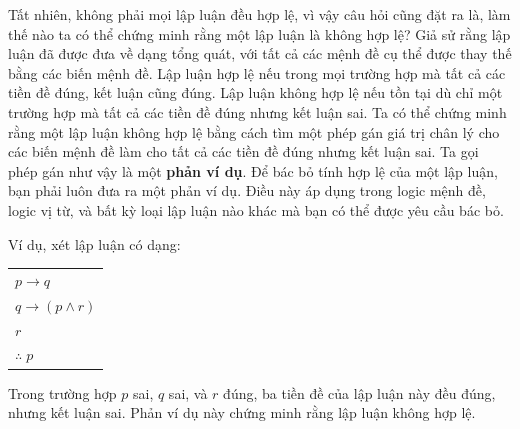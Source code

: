 Tất nhiên, không phải mọi lập luận đều hợp lệ, vì vậy câu hỏi cũng đặt ra là, làm thế nào ta có thể chứng minh rằng một lập luận là không hợp lệ? Giả sử rằng lập luận đã được đưa về dạng tổng quát, với tất cả các mệnh đề cụ thể được thay thế bằng các biến mệnh đề. Lập luận hợp lệ nếu trong mọi trường hợp mà tất cả các tiền đề đúng, kết luận cũng đúng. Lập luận không hợp lệ nếu tồn tại dù chỉ một trường hợp mà tất cả các tiền đề đúng nhưng kết luận sai. Ta có thể chứng minh rằng một lập luận không hợp lệ bằng cách tìm một phép gán giá trị chân lý cho các biến mệnh đề làm cho tất cả các tiền đề đúng nhưng kết luận sai. Ta gọi phép gán như vậy là một \textbf{phản ví dụ}. Để bác bỏ tính hợp lệ của một lập luận, bạn phải luôn đưa ra một phản ví dụ. Điều này áp dụng trong logic mệnh đề, logic vị từ, và bất kỳ loại lập luận nào khác mà bạn có thể được yêu cầu bác bỏ.

Ví dụ, xét lập luận có dạng:
\begin{center}
\begin{tabular}{l}
$p \to q$ \\
$q \to (p \land r)$ \\
$r$ \\
\hline
$\therefore\; p$
\end{tabular}
\end{center}
Trong trường hợp $p$ sai, $q$ sai, và $r$ đúng, ba tiền đề của lập luận này đều đúng, nhưng kết luận sai. Phản ví dụ này chứng minh rằng lập luận không hợp lệ.

